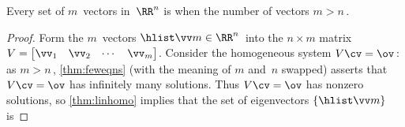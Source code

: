 \begin{theorem} \label{thm:mgtnli} 
Every  set of \(m\)~vectors in~\(\RR^n\) is  when the number of vectors \(m>n\)\,.
\end{theorem}
\begin{proof} 
Form the \(m\)~vectors \(\hlist\vv m\in\RR^n\)\ into the \(n\times m\) matrix \(V=\begin{bmatrix} \vv_1&\vv_2&\cdots&\vv_m \end{bmatrix}\).
Consider the homogeneous system \(V\cv=\ov\)\,: 
as \(m>n\)\,, \cref{thm:feweqns} (with the meaning of \(m\) and~\(n\) swapped) asserts that \(V\cv=\ov\) has infinitely many solutions.
Thus \(V\cv=\ov\) has nonzero solutions, so \cref{thm:linhomo} implies that the set of eigenvectors \(\{\hlist\vv m\}\) is 
\end{proof}



